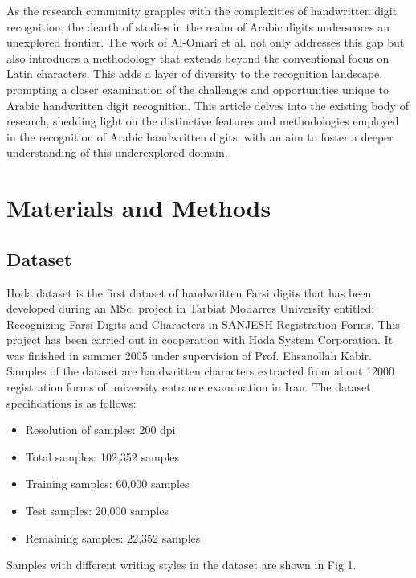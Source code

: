 \documentclass[9pt,twocolumn]{paper-template}
\begin{document}
As the research community grapples with the complexities of handwritten digit recognition, the dearth of studies in the realm of Arabic digits underscores an unexplored frontier. The work of Al-Omari et al. not only addresses this gap but also introduces a methodology that extends beyond the conventional focus on Latin characters. This adds a layer of diversity to the recognition landscape, prompting a closer examination of the challenges and opportunities unique to Arabic handwritten digit recognition. This article delves into the existing body of research, shedding light on the distinctive features and methodologies employed in the recognition of Arabic handwritten digits, with an aim to foster a deeper understanding of this underexplored domain.





\section*{Materials and Methods}


\subsection*{Dataset}

Hoda dataset is the first dataset of handwritten Farsi digits that has been developed during an MSc. project in Tarbiat Modarres University entitled: Recognizing Farsi Digits and Characters in SANJESH Registration Forms. This project has been carried out in cooperation with Hoda System Corporation. It was finished in summer 2005 under supervision of Prof. Ehsanollah Kabir. Samples of the dataset are handwritten characters extracted from about 12000 registration forms of university entrance examination in Iran. The dataset specifications is as follows:\\
\begin{itemize}
	\item Resolution of samples: 200 dpi
	\item Total samples: 102,352 samples
	\item Training samples: 60,000 samples
	\item Test samples: 20,000 samples
\item 	Remaining samples: 22,352 samples
\end{itemize}

Samples with different writing styles in the dataset are shown in Fig 1.
\end{document}
